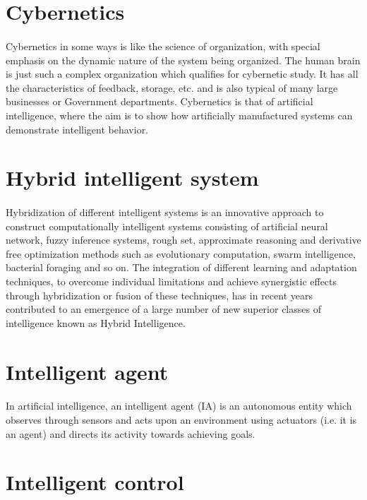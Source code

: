 \documentclass[12pt]{report}
\begin{document}
\section{Cybernetics}
\paragraph{} Cybernetics in some ways is like the science of organization, with special emphasis
on the dynamic nature of the system being organized. The human brain is just such a complex
organization which qualifies for cybernetic study. It has all the characteristics of feedback, storage,
etc. and is also typical of many large businesses or Government departments. Cybernetics is that
of artificial intelligence, where the aim is to show how artificially manufactured systems can
demonstrate intelligent behavior.
\section{Hybrid intelligent system}
\paragraph{} Hybridization of different intelligent systems is an innovative
approach to construct computationally intelligent systems consisting of artificial neural network,
fuzzy inference systems, rough set, approximate reasoning and derivative free optimization
methods such as evolutionary computation, swarm intelligence, bacterial foraging and so on. The
integration of different learning and adaptation techniques, to overcome individual limitations and
achieve synergistic effects through hybridization or fusion of these techniques, has in recent years
contributed to an emergence of a large number of new superior classes of intelligence known as
Hybrid Intelligence.
\section{Intelligent agent}
\paragraph{} In artificial intelligence, an intelligent agent (IA) is an autonomous entity
which observes through sensors and acts upon an environment using actuators (i.e. it is an agent)
and directs its activity towards achieving goals.
\section{Intelligent control}
\end{document}
